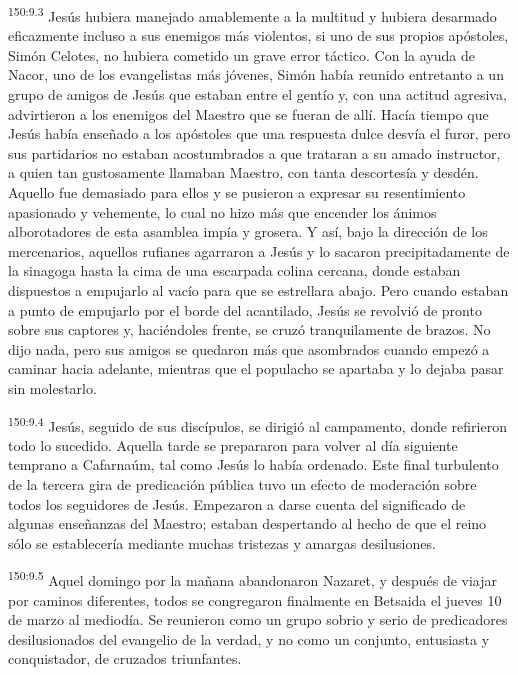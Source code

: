 \par 
\textsuperscript{150:9.3} Jesús hubiera manejado amablemente a la multitud y hubiera desarmado eficazmente incluso a sus enemigos más violentos, si uno de sus propios apóstoles, Simón Celotes, no hubiera cometido un grave error táctico. Con la ayuda de Nacor, uno de los evangelistas más jóvenes, Simón había reunido entretanto a un grupo de amigos de Jesús que estaban entre el gentío y, con una actitud agresiva, advirtieron a los enemigos del Maestro que se fueran de allí. Hacía tiempo que Jesús había enseñado a los apóstoles que una respuesta dulce desvía el furor, pero sus partidarios no estaban acostumbrados a que trataran a su amado instructor, a quien tan gustosamente llamaban Maestro, con tanta descortesía y desdén. Aquello fue demasiado para ellos y se pusieron a expresar su resentimiento apasionado y vehemente, lo cual no hizo más que encender los ánimos alborotadores de esta asamblea impía y grosera. Y así, bajo la dirección de los mercenarios, aquellos rufianes agarraron a Jesús y lo sacaron precipitadamente de la sinagoga hasta la cima de una escarpada colina cercana, donde estaban dispuestos a empujarlo al vacío para que se estrellara abajo. Pero cuando estaban a punto de empujarlo por el borde del acantilado, Jesús se revolvió de pronto sobre sus captores y, haciéndoles frente, se cruzó tranquilamente de brazos. No dijo nada, pero sus amigos se quedaron más que asombrados cuando empezó a caminar hacia adelante, mientras que el populacho se apartaba y lo dejaba pasar sin molestarlo.

\par 
\textsuperscript{150:9.4} Jesús, seguido de sus discípulos, se dirigió al campamento, donde refirieron todo lo sucedido. Aquella tarde se prepararon para volver al día siguiente temprano a Cafarnaúm, tal como Jesús lo había ordenado. Este final turbulento de la tercera gira de predicación pública tuvo un efecto de moderación sobre todos los seguidores de Jesús. Empezaron a darse cuenta del significado de algunas enseñanzas del Maestro; estaban despertando al hecho de que el reino sólo se establecería mediante muchas tristezas y amargas desilusiones.

\par 
\textsuperscript{150:9.5} Aquel domingo por la mañana abandonaron Nazaret, y después de viajar por caminos diferentes, todos se congregaron finalmente en Betsaida el jueves 10 de marzo al mediodía. Se reunieron como un grupo sobrio y serio de predicadores desilusionados del evangelio de la verdad, y no como un conjunto, entusiasta y conquistador, de cruzados triunfantes.